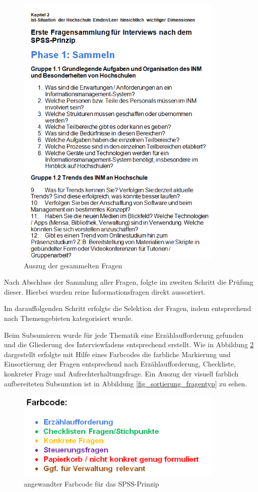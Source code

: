 \begin{figure}[h!]
	\centering
	\includegraphics[width=10cm]{kapitel/gruppe2/bilder/auszug_fragen}
	\caption{Auszug der gesammelten Fragen}
	\label{fig_auszug_fragen_sammeln}
\end{figure}

Nach Abschluss der Sammlung aller Fragen, folgte im zweiten Schritt die Prüfung dieser. Hierbei wurden reine Informationsfragen direkt aussortiert. 

Im darauffolgenden Schritt erfolgte die Selektion der Fragen, indem entsprechend nach Themengebieten kategorisiert wurde. 

Beim Subsumieren wurde für jede Thematik eine Erzählaufforderung gefunden und die Gliederung des Interviewfadens entsprechend erstellt. Wie in Abbildung \ref{fig_farbcode_SPSS} dargestellt erfolgte mit Hilfe eines Farbcodes die farbliche Markierung und Einsortierung der Fragen entsprechend nach Erzählaufforderung, Checkliste, konkreter Frage und Aufrechterhaltungsfrage. Ein Auszug der visuell farblich aufbereiteten Subsumtion ist in Abbildung \ref{fig_sortierung_fragentyp} zu sehen.

\begin{figure}[h!]
	\centering
	\includegraphics[width=10cm]{kapitel/gruppe2/bilder/farbcode_spss}
	\caption{angewandter Farbcode für das SPSS-Prinzip}
	\label{fig_farbcode_SPSS}
\end{figure}

